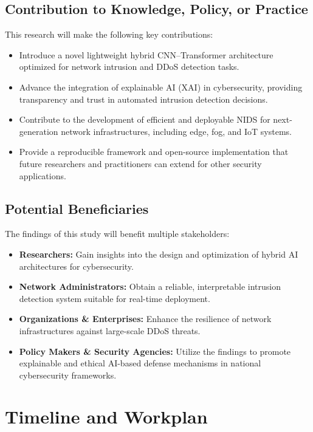 \documentclass[12pt, a4paper]{report}
\begin{document}
\section{Contribution to Knowledge, Policy, or Practice}
This research will make the following key contributions:
\begin{itemize}
    \item Introduce a novel lightweight hybrid CNN--Transformer architecture optimized for network intrusion and DDoS detection tasks.
    \item Advance the integration of explainable AI (XAI) in cybersecurity, providing transparency and trust in automated intrusion detection decisions.
    \item Contribute to the development of efficient and deployable NIDS for next-generation network infrastructures, including edge, fog, and IoT systems.
    \item Provide a reproducible framework and open-source implementation that future researchers and practitioners can extend for other security applications.
\end{itemize}

\section{Potential Beneficiaries}
The findings of this study will benefit multiple stakeholders:
\begin{itemize}
    \item \textbf{Researchers:} Gain insights into the design and optimization of hybrid AI architectures for cybersecurity.
    \item \textbf{Network Administrators:} Obtain a reliable, interpretable intrusion detection system suitable for real-time deployment.
    \item \textbf{Organizations \& Enterprises:} Enhance the resilience of network infrastructures against large-scale DDoS threats.
    \item \textbf{Policy Makers \& Security Agencies:} Utilize the findings to promote explainable and ethical AI-based defense mechanisms in national cybersecurity frameworks.
\end{itemize}

\chapter{Timeline and Workplan}
\end{document}
